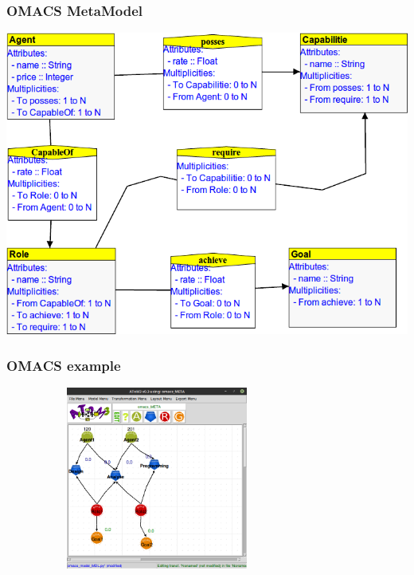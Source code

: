\documentclass[12pt]{beamer}
\begin{document}
 
\begin{frame}
\frametitle{OMACS MetaModel} 
	 \begin{center}	
	\includegraphics[scale=0.5]{omacs_meta}
	\end{center}
\end{frame}
 
\begin{frame}
\frametitle{OMACS example} 
	 \begin{center}	
	\includegraphics[width=10cm,height=6cm]{omacs_ex}
	\end{center}
\end{frame}
 
\end{document}
